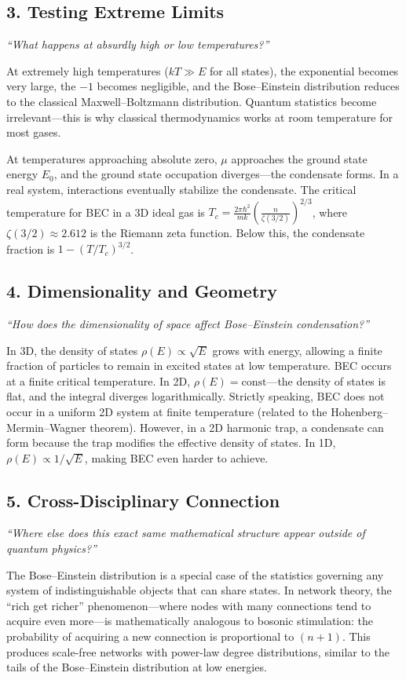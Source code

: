 \subsection*{3. Testing Extreme Limits}
\textit{``What happens at absurdly high or low temperatures?''}

At extremely high temperatures ($kT \gg E$ for all states), the exponential becomes very large, the $-1$ becomes negligible, and the Bose--Einstein distribution reduces to the classical Maxwell--Boltzmann distribution. Quantum statistics become irrelevant---this is why classical thermodynamics works at room temperature for most gases.

At temperatures approaching absolute zero, $\mu$ approaches the ground state energy $E_0$, and the ground state occupation diverges---the condensate forms. In a real system, interactions eventually stabilize the condensate. The critical temperature for BEC in a 3D ideal gas is $T_c = \frac{2\pi\hbar^2}{mk}\left(\frac{n}{\zeta(3/2)}\right)^{2/3}$, where $\zeta(3/2) \approx 2.612$ is the Riemann zeta function. Below this, the condensate fraction is $1 - (T/T_c)^{3/2}$.

\subsection*{4. Dimensionality and Geometry}
\textit{``How does the dimensionality of space affect Bose--Einstein condensation?''}

In 3D, the density of states $\rho(E) \propto \sqrt{E}$ grows with energy, allowing a finite fraction of particles to remain in excited states at low temperature. BEC occurs at a finite critical temperature. In 2D, $\rho(E) = \text{const}$---the density of states is flat, and the integral diverges logarithmically. Strictly speaking, BEC does not occur in a uniform 2D system at finite temperature (related to the Hohenberg--Mermin--Wagner theorem). However, in a 2D harmonic trap, a condensate can form because the trap modifies the effective density of states. In 1D, $\rho(E) \propto 1/\sqrt{E}$, making BEC even harder to achieve.

\subsection*{5. Cross-Disciplinary Connection}
\textit{``Where else does this exact same mathematical structure appear outside of quantum physics?''}

The Bose--Einstein distribution is a special case of the statistics governing any system of indistinguishable objects that can share states. In network theory, the ``rich get richer'' phenomenon---where nodes with many connections tend to acquire even more---is mathematically analogous to bosonic stimulation: the probability of acquiring a new connection is proportional to $(n + 1)$. This produces scale-free networks with power-law degree distributions, similar to the tails of the Bose--Einstein distribution at low energies.

